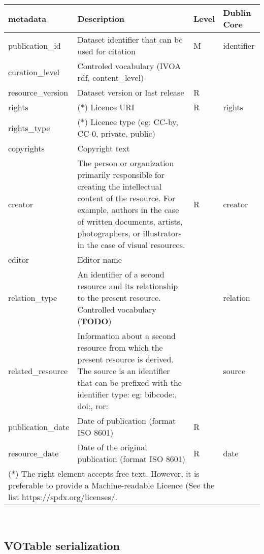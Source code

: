 \documentclass[11pt,a4paper]{ivoa}
\begin{document}
\begin{tabular}{|l|p{5cm}|l|l|}  \hline
\textbf{metadata} & \textbf{Description} & \textbf{Level} & \textbf{Dublin Core}\\ \hline
publication\_id    & Dataset identifier that can be used for citation& M  & identifier\\ \hline
curation\_level    & Controled vocabulary
                   (IVOA rdf, content\_level) &  &  \\ \hline
resource\_version  & Dataset version or last release & R & \\ \hline 
rights             & (*) Licence URI & R & rights\\ \hline
rights\_type       & (*) Licence type (eg: CC-by, CC-0, private, public) &  &  \\ \hline
copyrights         & Copyright text &  & \\ \hline
creator            & The person or organization primarily responsible for creating the
                     intellectual content of the resource.  For example, authors in the
                     case of written documents, artists, photographers, or illustrators in
                     the case of visual resources. & R & creator\\ \hline
editor             & Editor name &  & \\ \hline
relation\_type     & An identifier of a second resource and its relationship to the
                     present resource. 
                     Controlled vocabulary (\textbf{TODO}) & & relation\\ \hline
related\_resource  & Information about a second resource from which the present resource
                     is derived. The source is an identifier that can be prefixed with the identifier type: eg: bibcode:, doi:, ror: &  & source\\ \hline
publication\_date  & Date of publication (format ISO 8601) &  R &  \\ \hline
resource\_date     & Date of the original publication (format ISO 8601) & R & date\\ \hline
\multicolumn{3}{p{8cm}}{(*) The right element	accepts free text. However,	it is preferable to provide	a Machine-readable Licence (See the list https://spdx.org/licenses/.}
\end{tabular}\\



\subsection{VOTable serialization}
\end{document}
